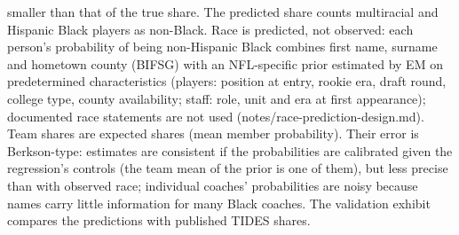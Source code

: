\begin{table}[!h]
{\begin{threeparttable}
\begin{tablenotes}[para]
smaller than that of the true share. The predicted share counts multiracial and Hispanic Black players as non-Black. Race is predicted, not observed: each person's probability of being non-Hispanic Black combines first name, surname and hometown county (BIFSG) with an NFL-specific prior estimated by EM on predetermined characteristics (players: position at entry, rookie era, draft round, college type, county availability; staff: role, unit and era at first appearance); documented race statements are not used (notes/race-prediction-design.md). Team shares are expected shares (mean member probability). Their error is Berkson-type: estimates are consistent if the probabilities are calibrated given the regression's controls (the team mean of the prior is one of them), but less precise than with observed race; individual coaches' probabilities are noisy because names carry little information for many Black coaches. The validation exhibit compares the predictions with published TIDES shares.
\end{tablenotes}
\end{threeparttable}}
\end{table}
